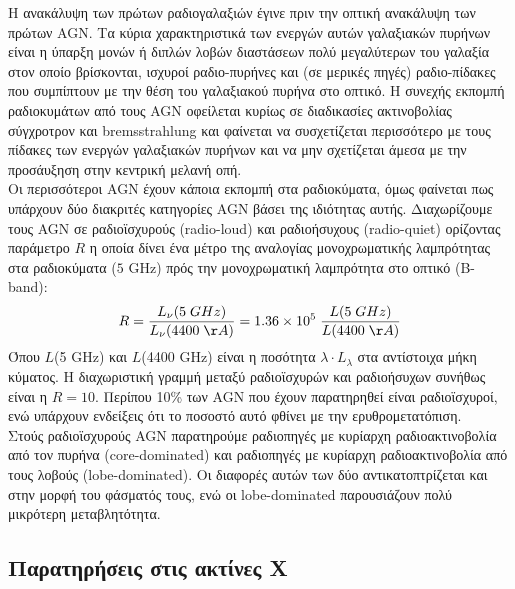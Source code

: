 Η ανακάλυψη των πρώτων ραδιογαλαξιών έγινε πριν την οπτική ανακάλυψη των πρώτων \textlatin{AGN}. Τα κύρια χαρακτηριστικά των ενεργών αυτών γαλαξιακών πυρήνων είναι η ύπαρξη μονών ή διπλών λοβών διαστάσεων πολύ μεγαλύτερων του γαλαξία στον οποίο βρίσκονται, ισχυροί ραδιο-πυρήνες και (σε μερικές πηγές) ραδιο-πίδακες που συμπίπτουν με την θέση του γαλαξιακού πυρήνα στο οπτικό. Η συνεχής εκπομπή ραδιοκυμάτων από τους \textlatin{AGN} οφείλεται κυρίως σε διαδικασίες ακτινοβολίας σύγχροτρον και \textlatin{bremsstrahlung} και φαίνεται να συσχετίζεται περισσότερο με τους πίδακες των ενεργών γαλαξιακών πυρήνων και να μην σχετίζεται άμεσα με την προσάυξηση στην κεντρική μελανή οπή\cite{Radcliffe}.\\   
Οι περισσότεροι \textlatin{AGN} έχουν κάποια εκπομπή στα ραδιοκύματα, όμως φαίνεται πως υπάρχουν δύο διακριτές κατηγορίες \textlatin{AGN} βάσει της ιδιότητας αυτής. Διαχωρίζουμε τους \textlatin{AGN} σε ραδιοϊσχυρούς \textlatin{(radio-loud)} και ραδιοήσυχους \textlatin{(radio-quiet)} ορίζοντας παράμετρο $R$ η οποία δίνει ένα μέτρο της αναλογίας μονοχρωματικής λαμπρότητας στα ραδιοκύματα ($5$ \textlatin{GHz}) πρός την μονοχρωματική λαμπρότητα στο οπτικό (\textlatin{B-band}):
$$ R = \dfrac{L_\nu(5\;GHz)}{L_\nu (4400\;\AA)} = 1.36 \times 10^{5} \;\dfrac{L(5\;GHz)}{L (4400\;\AA)} $$
Όπου $L$(5 \textlatin{GHz}) και $L$(4400 \textlatin{GHz}) είναι η ποσότητα $\lambda \cdot L_\lambda$ στα αντίστοιχα μήκη κύματος. Η διαχωριστική γραμμή μεταξύ ραδιοϊσχυρών και ραδιοήσυχων συνήθως είναι η $R=10$. Περίπου 10\% των \textlatin{AGN} που έχουν παρατηρηθεί είναι ραδιοϊσχυροί, ενώ υπάρχουν ενδείξεις ότι το ποσοστό αυτό φθίνει με την ερυθρομετατόπιση. \\
Στούς ραδιοϊσχυρούς \textlatin{AGN} παρατηρούμε ραδιοπηγές με κυρίαρχη ραδιοακτινοβολία από τον πυρήνα \textlatin{(core-dominated)} και ραδιοπηγές με κυρίαρχη ραδιοακτινοβολία από τους λοβούς \textlatin{(lobe-dominated)}. Οι διαφορές αυτών των δύο αντικατοπτρίζεται και στην μορφή του φάσματός τους, ενώ οι \textlatin{lobe-dominated} παρουσιάζουν πολύ μικρότερη μεταβλητότητα\cite{netzer_2013}.

\subsection*{Παρατηρήσεις στις ακτίνες Χ}

